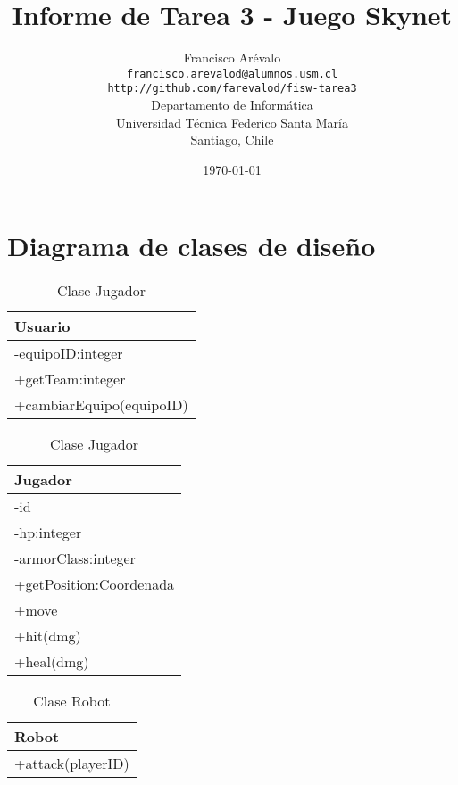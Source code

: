 \documentclass{article}
\begin{document}
\title{Informe de Tarea 3 - Juego Skynet}
\author{Francisco Ar\'evalo\\
  \texttt{francisco.arevalod@alumnos.usm.cl}\\
  \texttt{http://github.com/farevalod/fisw-tarea3}\\
  \vspace{10mm}
  Departamento de Inform\'atica\\
  Universidad T\'ecnica Federico Santa Mar\'ia\\
  Santiago, Chile}
\date{\today}
\maketitle
\tableofcontents
\section{Diagrama de clases de dise\~no}
\begin{table}
	\centering
	\begin{tabular}{|l|}
	\hline
		Usuario\\
	\hline
		-equipoID:integer\\
		+getTeam:integer\\
		+cambiarEquipo(equipoID)\\
	  \hline
	\end{tabular}
	\caption{Clase Jugador}
	\label{tab:jugador}
\end{table}
\begin{table}
	\centering
	\begin{tabular}{|l|}
	\hline
		Jugador\\
	\hline
		-id\\
		-hp:integer\\
		-armorClass:integer\\
		+getPosition:Coordenada\\
		+move\\
		+hit(dmg)\\
		+heal(dmg)\\
	  \hline
	\end{tabular}
	\caption{Clase Jugador}
	\label{tab:jugador}
\end{table}
\begin{table}
	\centering
	\begin{tabular}{|l|}
	\hline
		Robot\\
	\hline
		+attack(playerID)\\
	  \hline
	\end{tabular}
	\caption{Clase Robot}
	\label{tab:robot}
\end{table}
\end{document}

